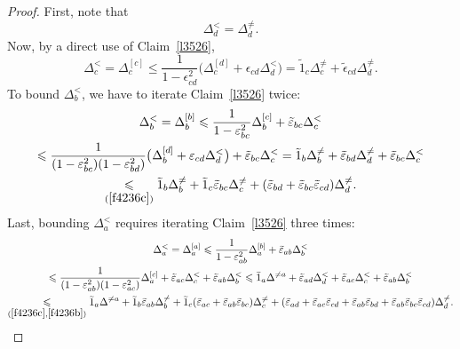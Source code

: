 \begin{proof}
First, note that
\[\label{f4236d} \Delta^<_d = \Delta^{\neq}_d .\]
Now, by a direct use of Claim~\ref{l3526},
\[\label{f4236c} \Delta^<_c = \Delta^{[c]}_c
\leq \frac{1}{1-\epsilon_{cd}^2} \big( \Delta^{[d]}_c + \epsilon_{cd} \Delta^{<}_d \big)
= \tilde1_c \Delta^{\neq}_c + \tilde{\epsilon}_{cd} \Delta^{\neq}_d .\]
%
To bound $\Delta^<_b$, we have to iterate Claim~\ref{l3526} twice:
\begin{multline}\label{f4236b}
\Delta^<_b = \Delta^{[b]}_b
\leq \frac{1}{1-\epsilon_{bc}^2} \Delta^{[c]}_b + \teps_{bc} \Delta^{<}_c \\
\leq \frac{1}{(1-\epsilon_{bc}^2)(1-\epsilon_{bd}^2)}
\big( \Delta^{[d]}_b + \epsilon_{cd} \Delta^{<}_d \big) + \teps_{bc} \Delta^<_c
= \tilde1_b \Delta^{\neq}_b + \teps_{bd} \Delta^{\neq}_d + \teps_{bc} \Delta^<_c \\
\footrel{(\ref{f4236c})}\leq
\tilde1_b \Delta^{\neq}_b + \tilde1_c \teps_{bc} \Delta^{\neq}_c
+ (\teps_{bd} + \teps_{bc}\teps_{cd}) \Delta^{\neq}_d .
\end{multline}
%
Last, bounding $\Delta^{<}_a$ requires iterating Claim~\ref{l3526} three times:
\begin{multline}\label{f4236a}
\Delta^<_a = \Delta^{[a]}_a
\leq \frac{1}{1-\epsilon_{ab}^2} \Delta^{[b]}_a + \teps_{ab} \Delta^<_b \\
\leq \frac{1}{(1-\epsilon_{ab}^2)(1-\epsilon_{ac}^2)} \Delta^{[c]}_a
+ \teps_{ac} \Delta^<_c + \teps_{ab} \Delta^<_b 
\leq \tilde1_a \Delta^{\neq a} + \teps_{ad} \Delta^<_d
+ \teps_{ac} \Delta^<_c + \teps_{ab} \Delta^<_b \\
\footrel{(\ref{f4236c},\ref{f4236b})}
\leq \tilde1_a \Delta^{\neq a} + \tilde1_b \teps_{ab} \Delta^{\neq}_b
+ \tilde1_c (\teps_{ac} + \teps_{ab}\teps_{bc}) \Delta^{\neq}_c
+ (\teps_{ad} + \teps_{ac}\teps_{cd}
+ \teps_{ab}\teps_{bd}
+ \teps_{ab}\teps_{bc}\teps_{cd}) \Delta^{\neq}_d.
\end{multline}


\end{proof}

